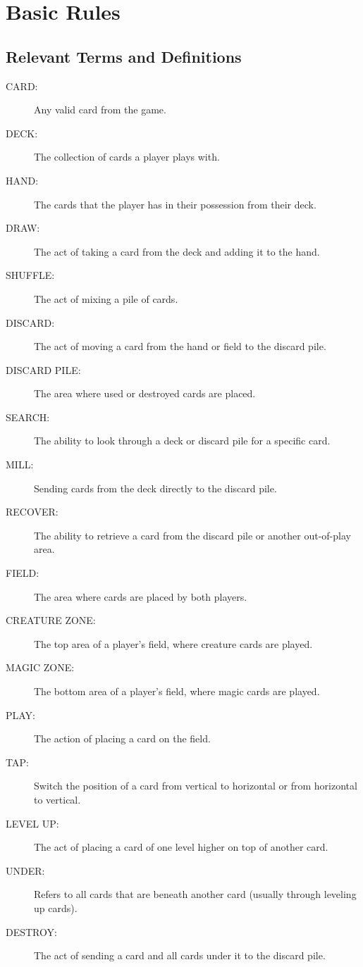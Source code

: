 \chapter{Basic Rules}

\section{Relevant Terms and Definitions}
\begin{description}
    \item[CARD:] Any valid card from the game.
    \item[DECK:] The collection of cards a player plays with.
    \item[HAND:] The cards that the player has in their possession from their deck.
    \item[DRAW:] The act of taking a card from the deck and adding it to the hand.
    \item[SHUFFLE:] The act of mixing a pile of cards.
    \item[DISCARD:] The act of moving a card from the hand or field to the discard pile.
    \item[DISCARD PILE:] The area where used or destroyed cards are placed.
    \item[SEARCH:] The ability to look through a deck or discard pile for a specific card.
    \item[MILL:] Sending cards from the deck directly to the discard pile.
    \item[RECOVER:] The ability to retrieve a card from the discard pile or another out-of-play area.
    \item[FIELD:] The area where cards are placed by both players.
    \item[CREATURE ZONE:] The top area of a player's field, where creature cards are played.
    \item[MAGIC ZONE:] The bottom area of a player's field, where magic cards are played.
    \item[PLAY:] The action of placing a card on the field.
    \item[TAP:] Switch the position of a card from vertical to horizontal or from horizontal to vertical.
    \item[LEVEL UP:] The act of placing a card of one level higher on top of another card.
    \item[UNDER:] Refers to all cards that are beneath another card (usually through leveling up cards).
    \item[DESTROY:] The act of sending a card and all cards under it to the discard pile.

\end{description}
